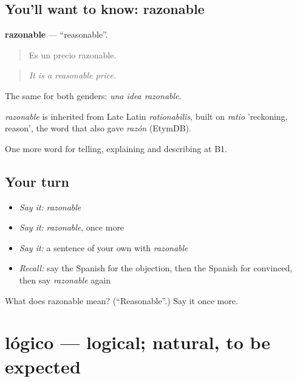 \subsection*{You'll want to know: razonable}
\textbf{razonable} — \textquotedblleft{}reasonable\textquotedblright{}.

\begin{quote}
Es un precio razonable.
\end{quote}

\begin{quote}
\emph{It is a reasonable price.}
\end{quote}

The same for both genders: \emph{una idea razonable}.

\begin{cousinweb}
\emph{razonable} is inherited from Late Latin \emph{rationabilis}, built on \emph{ratio} 'reckoning, reason', the word that also gave \emph{razón} (EtymDB).
\end{cousinweb}

\begin{grammarlens}[title={What you've built}]
One more word for telling, explaining and describing at B1.
\end{grammarlens}

\subsection*{Your turn}
\begin{itemize}
\raggedright
  \item \emph{Say it:} \emph{razonable}
  \item \emph{Say it:} \emph{razonable}, once more
  \item \emph{Say it:} a sentence of your own with \emph{razonable}
  \item \emph{Recall:} say the Spanish for the objection, then the Spanish for convinced, then say \emph{razonable} again
\end{itemize}

\begin{tcolorbox}[breakable,colback=teal!4,colframe=teal!35!black,title={Before you move on}]
What does razonable mean? (\textquotedblleft{}Reasonable\textquotedblright{}.) Say it once more.
\end{tcolorbox}
\section[lógico]{lógico — logical; natural, to be expected}

